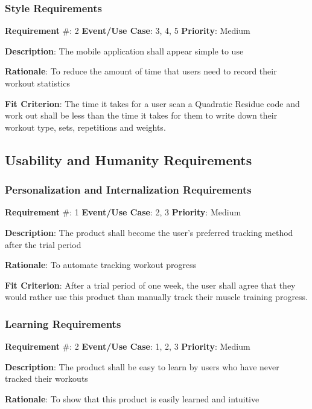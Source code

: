 \documentclass{article}
\newcommand\tab{\hspace*{2cm}}
\begin{document}
\medskip

\subsubsection{Style Requirements}

\textbf{Requirement} \#: 2 \tab \textbf{Event/Use Case}: 3, 4, 5 \tab \textbf{Priority}: Medium

\textbf{Description}: The mobile application shall appear simple to use

\textbf{Rationale}: To reduce the amount of time that users need to record their workout statistics

\textbf{Fit Criterion}: The time it takes for a user scan a Quadratic Residue code and work out shall be less than the time it takes for them to write down their workout type, sets, repetitions and weights.

\medskip

\subsection{Usability and Humanity Requirements}

\subsubsection{Personalization and Internalization Requirements}
\textbf{Requirement} \#: 1 \tab \textbf{Event/Use Case}: 2, 3 \tab \textbf{Priority}: Medium

\textbf{Description}: The product shall become the user’s preferred tracking method after the trial period

\textbf{Rationale}: To automate tracking workout progress

\textbf{Fit Criterion}: After a trial period of one week, the user shall agree that they would rather use this product than manually track their muscle training progress.

\medskip

\subsubsection{Learning Requirements}
\textbf{Requirement} \#: 2 \tab \textbf{Event/Use Case}: 1, 2, 3 \tab \textbf{Priority}: Medium

\textbf{Description}: The product shall be easy to learn by users who have never tracked their workouts

\textbf{Rationale}: To show that this product is easily learned and intuitive
\end{document}
